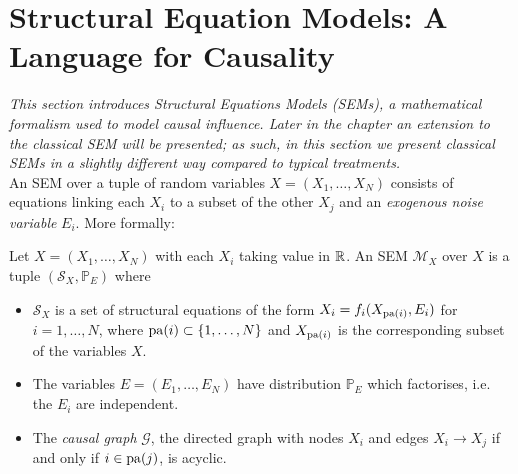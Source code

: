 

\section{Structural Equation Models: A Language for Causality}

\emph{This section introduces Structural Equations Models (SEMs), a mathematical formalism used to model causal influence. Later in the chapter an extension to the classical SEM will be presented; as such, in this section we present classical SEMs in a slightly different way compared to typical treatments.}
\\

\noindent An SEM over a tuple of random variables $X = (X_1, \ldots, X_N)$ consists of equations linking each $X_i$ to a subset of the other $X_j$ and an \emph{exogenous noise variable} $E_i$. More formally:

\begin{definition}
Let $X = (X_1, \ldots, X_N)$ with each $X_i$ taking value in $\mathbb{R}$. An SEM $\mathcal{M}_X$ over $X$ is a tuple $(\mathcal{S}_X, \mathbb{P}_E)$ where
\begin{itemize}
	\item $\mathcal{S}_X$ is a set of structural equations of the form $X_i = f_i(X_{\operatorname{pa}(i)}, E_i)$ for $i=1,\ldots,N$, where $\operatorname{pa}(i) \subset \{1,\ldots,N\}$ and $X_{\operatorname{pa}(i)}$ is the corresponding subset of the variables $X$.
	\item The variables $E = (E_1,\ldots,E_N)$ have distribution $\mathbb{P}_E$ which factorises, i.e. the $E_i$ are independent.
	\item The \emph{causal graph} $\mathcal{G}$, the directed graph with nodes $X_i$ and edges $X_i \to X_j$ if and only if $i \in \operatorname{pa}(j)$, is acyclic.
\end{itemize}
\end{definition}

